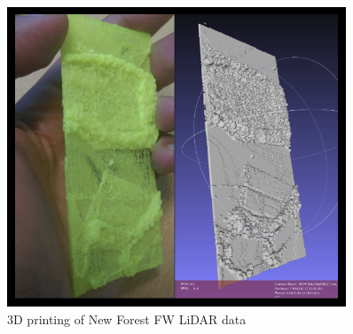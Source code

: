 \documentclass{subfiles}
\begin{document}
   \begin{figure} [h!]
   	\centering
   	\includegraphics[width=0.9\textwidth]{img/NF-3Dprint}
   	\caption[3D printing]{3D printing of New Forest FW LiDAR data}
   	\label{fig:3Dprinting}
   \end{figure}

 
\end{document}
